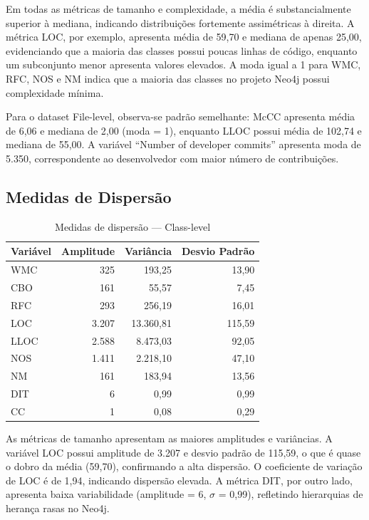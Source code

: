 \documentclass[12pt]{article}
\begin{document}
Em todas as métricas de tamanho e complexidade, a média é substancialmente superior à mediana, indicando distribuições fortemente assimétricas à direita. A métrica LOC, por exemplo, apresenta média de 59,70 e mediana de apenas 25,00, evidenciando que a maioria das classes possui poucas linhas de código, enquanto um subconjunto menor apresenta valores elevados. A moda igual a 1 para WMC, RFC, NOS e NM indica que a maioria das classes no projeto Neo4j possui complexidade mínima.

Para o dataset File-level, observa-se padrão semelhante: McCC apresenta média de 6,06 e mediana de 2,00 (moda = 1), enquanto LLOC possui média de 102,74 e mediana de 55,00. A variável ``Number of developer commits'' apresenta moda de 5.350, correspondente ao desenvolvedor com maior número de contribuições.

\subsection{Medidas de Dispersão}

\begin{table}[H]
\centering
\caption{Medidas de dispersão --- Class-level}
\label{tab:dispersao_class}
\small
\begin{tabular}{lrrr}
\toprule
\textbf{Variável} & \textbf{Amplitude} & \textbf{Variância} & \textbf{Desvio Padrão} \\
\midrule
WMC   & 325     & 193,25   & 13,90 \\
CBO   & 161     & 55,57    & 7,45 \\
RFC   & 293     & 256,19   & 16,01 \\
LOC   & 3.207   & 13.360,81 & 115,59 \\
LLOC  & 2.588   & 8.473,03  & 92,05 \\
NOS   & 1.411   & 2.218,10  & 47,10 \\
NM    & 161     & 183,94   & 13,56 \\
DIT   & 6       & 0,99     & 0,99 \\
CC    & 1       & 0,08     & 0,29 \\
\bottomrule
\end{tabular}
\end{table}

As métricas de tamanho apresentam as maiores amplitudes e variâncias. A variável LOC possui amplitude de 3.207 e desvio padrão de 115,59, o que é quase o dobro da média (59,70), confirmando a alta dispersão. O coeficiente de variação de LOC é de 1,94, indicando dispersão elevada. A métrica DIT, por outro lado, apresenta baixa variabilidade (amplitude = 6, $\sigma$ = 0,99), refletindo hierarquias de herança rasas no Neo4j.
\end{document}
